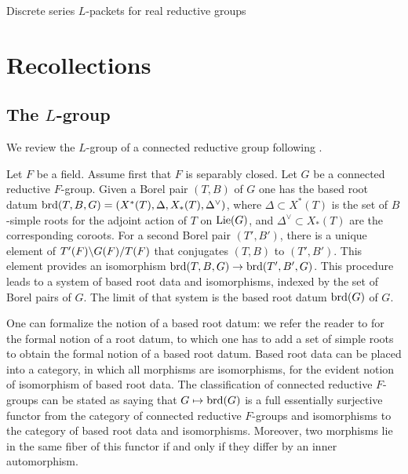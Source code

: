 \documentclass{article}
\theoremstyle{definition}
\numberwithin{equation}{section}
\renewcommand{\-}{\hyp{}}
\begin{document}
\begin{mytitle} Discrete series $L$-packets for real reductive groups \end{mytitle}

\tableofcontents

\section{Recollections}

\subsection{The $L$-group}

We review the $L$-group of a connected reductive group following \cite[\S2]{Vog93}.

Let $F$ be a field. Assume first that $F$ is separably closed. Let $G$ be a connected reductive $F$-group. Given a Borel pair $(T,B)$ of $G$ one has the based root datum $\textrm{brd}(T,B,G)=(X^*(T),\Delta,X_*(T),\Delta^\vee)$, where $\Delta \subset X^*(T)$ is the set of $B$-simple roots for the adjoint action of $T$ on $\textrm{Lie}(G)$, and $\Delta^\vee \subset X_*(T)$ are the corresponding coroots. For a second Borel pair $(T',B')$, there is a unique element of $T'(F)\backslash G(F)/T(F)$ that conjugates $(T,B)$ to $(T',B')$. This element provides an isomorphism $\textrm{brd}(T,B,G) \to \textrm{brd}(T',B',G)$. This procedure leads to a system of based root data and isomorphisms, indexed by the set of Borel pairs of $G$. The limit of that system is the based root datum $\textrm{brd}(G)$ of $G$.

One can formalize the notion of a based root datum: we refer the reader to \cite[\S7.4]{Spr98} for the formal notion of a root datum, to which one has to add a set of simple roots to obtain the formal notion of a based root datum. Based root data can be placed into a category, in which all morphisms are isomorphisms, for the evident notion of isomorphism of based root data. The classification of connected reductive $F$-groups \cite[Theorem 9.6.2, Theorem 10.1.1]{Spr98} can be stated as saying that $G \mapsto \textrm{brd}(G)$ is a full essentially surjective functor from the category of connected reductive $F$-groups and isomorphisms to the category of based root data and isomorphisms. Moreover, two morphisms lie in the same fiber of this functor if and only if they differ by an inner automorphism.
\end{document}
